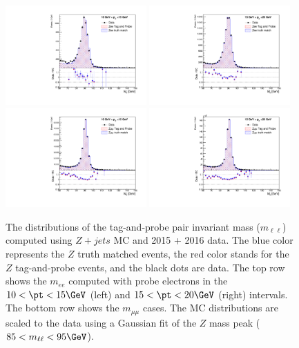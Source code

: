 \begin{figure}[htbp]
\includegraphics[width=0.48\textwidth]{signal_level_Mee_pt1015_ratio_plot_MC_normalized}
\includegraphics[width=0.48\textwidth]{signal_level_Mee_pt1520_ratio_plot_MC_normalized}\\
\includegraphics[width=0.48\textwidth]{signal_level_Mmumu_pt1015_ratio_plot_MC_normalized}
\includegraphics[width=0.48\textwidth]{signal_level_Mmumu_pt1520_ratio_plot_MC_normalized}
\caption{The distributions of the tag-and-probe pair invariant mass ($m_{\ell\ell}$) computed using $Z+jets$ MC and 2015 + 2016 data.
The blue color represents the $Z$ truth matched events, the red color stands for the $Z$ tag-and-probe events, and the black dots are data.
The top row shows the $m_{ee}$ computed with probe electrons in the $10<\pt<15 \GeV$ (left) and $15<\pt<20 \GeV$ (right) intervals.
The bottom row shows the $m_{\mu\mu}$ cases.
The MC distributions are scaled to the data using a Gaussian fit of the $Z$ mass peak ($85<m_{\ell\ell}<95 \GeV$).}
\label{fig:RLE_mll_distributions}
\end{figure}

